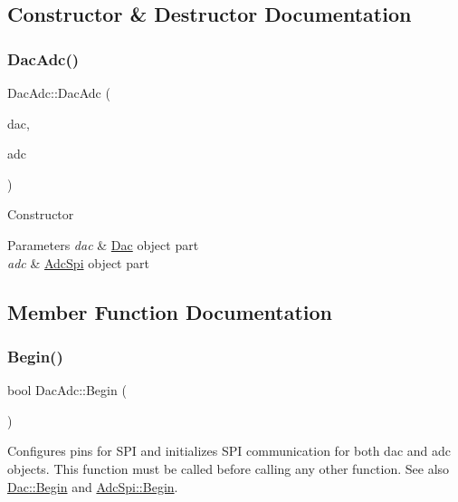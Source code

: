 \subsection{Constructor \& Destructor Documentation}
\mbox{\label{classDacAdc_afb5c669fd66e4ff549506a58af0916e1}} 
\subsubsection{\texorpdfstring{Dac\+Adc()}{DacAdc()}}
{\footnotesize\ttfamily Dac\+Adc\+::\+Dac\+Adc (\begin{DoxyParamCaption}\item[{\mbox{\hyperlink{classDac}{Dac}} \&}]{dac,  }\item[{\mbox{\hyperlink{classAdcSpi}{Adc\+Spi}} \&}]{adc }\end{DoxyParamCaption})}

Constructor 
\begin{DoxyParams}{Parameters}
{\em dac} & \mbox{\hyperlink{classDac}{Dac}} object part \\
\hline
{\em adc} & \mbox{\hyperlink{classAdcSpi}{Adc\+Spi}} object part \\
\hline
\end{DoxyParams}


\subsection{Member Function Documentation}
\mbox{\label{classDacAdc_adc136f0dd9872a8f10b908891a4f604b}} 
\subsubsection{\texorpdfstring{Begin()}{Begin()}}
{\footnotesize\ttfamily bool Dac\+Adc\+::\+Begin (\begin{DoxyParamCaption}\item[{void}]{ }\end{DoxyParamCaption})}

Configures pins for S\+PI and initializes S\+PI communication for both dac and adc objects. This function must be called before calling any other function. See also \mbox{\hyperlink{classDac_a342bb811b205d50baacb3211e89ea062}{Dac\+::\+Begin}} and \mbox{\hyperlink{classAdcSpi_aa8f8f27578dd85cfcdbc9439bbce66cb}{Adc\+Spi\+::\+Begin}}. \mbox{\label{classDacAdc_a9a6705b1fa5ecc977ef08a9189d3bf87}} 
